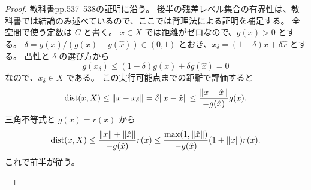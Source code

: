\documentclass[12pt,dvipdfmx]{article}
\theoremstyle{plain}
\begin{document}
\begin{proof}
    教科書pp.537--538の証明に沿う。
    後半の残差レベル集合の有界性は、教科書では結論のみ述べているので、ここでは背理法による証明を補足する。
    全空間で使う定数は $C$ と書く。
    $x \in X$ では距離がゼロなので、$g(x) > 0$ とする。
    $\delta = g(x)/(g(x) - g(\hat x)) \in (0, 1)$ とおき、$x_\delta = (1 - \delta)x + \delta\hat x$ とする。
    凸性と $\delta$ の選び方から
    \begin{equation*}
        g(x_\delta) \leq (1 - \delta)g(x) + \delta g(\hat x) = 0
    \end{equation*}
    なので、$x_\delta \in X$ である。
    この実行可能点までの距離で評価すると
    \begin{equation*}
        \operatorname{dist}(x, X)
        \leq \norm{x - x_\delta} = \delta\norm{x - \hat x}
        \leq \frac{\norm{x - \hat x}}{-g(\hat x)} g(x).
    \end{equation*}
    三角不等式と $g(x) = r(x)$ から
    \begin{equation*}
        \operatorname{dist}(x, X)
        \leq \frac{\norm{x} + \norm{\hat x}}{-g(\hat x)} r(x)
        \leq \frac{\max(1, \norm{\hat x})}{-g(\hat x)}(1 + \norm{x}) r(x).
    \end{equation*}
    これで前半が従う。

    \begin{center}
    \end{center}


\end{proof}
\end{document}
